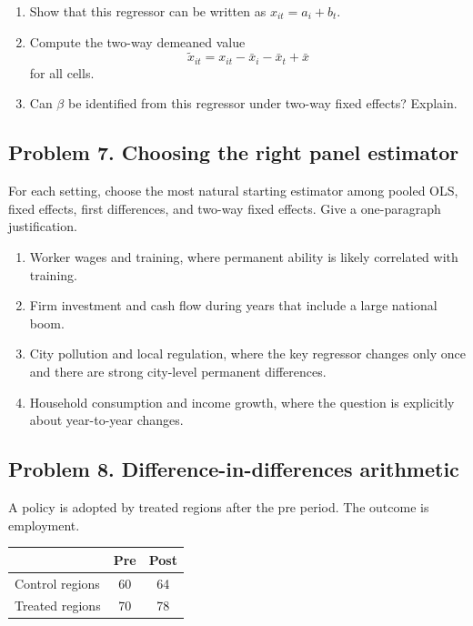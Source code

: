 \documentclass[11pt]{article}
\begin{document}
\begin{enumerate}[label=(\alph*)]
\item Show that this regressor can be written as $x_{it}=a_i+b_t$.
\item Compute the two-way demeaned value
\[
\tilde{x}_{it}=x_{it}-\bar{x}_i-\bar{x}_t+\bar{x}
\]
for all cells.
\item Can $\beta$ be identified from this regressor under two-way fixed effects? Explain.
\end{enumerate}

\subsection*{Problem 7. Choosing the right panel estimator}

For each setting, choose the most natural starting estimator among pooled OLS, fixed effects, first differences, and two-way fixed effects. Give a one-paragraph justification.

\begin{enumerate}[label=(\alph*)]
\item Worker wages and training, where permanent ability is likely correlated with training.
\item Firm investment and cash flow during years that include a large national boom.
\item City pollution and local regulation, where the key regressor changes only once and there are strong city-level permanent differences.
\item Household consumption and income growth, where the question is explicitly about year-to-year changes.
\end{enumerate}

\subsection*{Problem 8. Difference-in-differences arithmetic}

A policy is adopted by treated regions after the pre period. The outcome is employment.

\begin{center}
\begin{tabular}{lcc}
\toprule
 & Pre & Post \\
\midrule
Control regions & 60 & 64 \\
Treated regions & 70 & 78 \\
\bottomrule
\end{tabular}
\end{center}
\end{document}
